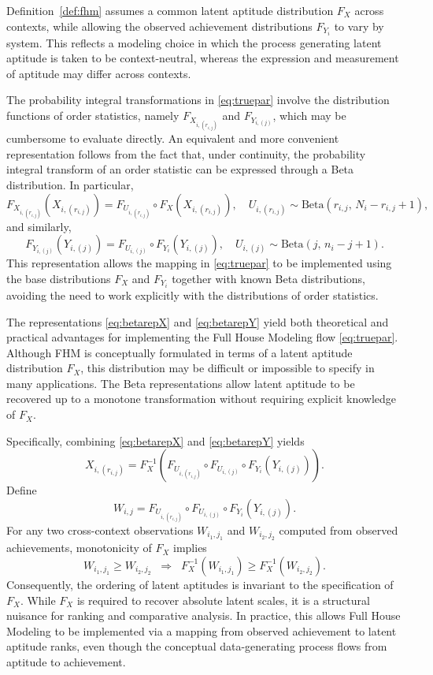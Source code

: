 \documentclass[12pt]{article}
\begin{document}
Definition~\ref{def:fhm} assumes a common latent aptitude distribution $F_X$ across contexts, while allowing the observed achievement distributions $F_{Y_i}$ to vary by system. This reflects a modeling choice in which the process generating latent aptitude is taken to be context-neutral, whereas the expression and measurement of aptitude may differ across contexts.

The probability integral transformations in \eqref{eq:truepar} involve the distribution functions of order statistics, namely $F_{X_{i,(r_{i,j})}}$ and $F_{Y_{i,(j)}}$, which may be cumbersome to evaluate directly. An equivalent and more convenient representation follows from the fact that, under continuity, the probability integral transform of an order statistic can be expressed through a Beta distribution. In particular,
\begin{equation} \label{eq:betarepX}
F_{X_{i,(r_{i,j})}}\!\left(X_{i,(r_{i,j})}\right)
= F_{U_{i,(r_{i,j})}} \circ F_X\!\left(X_{i,(r_{i,j})}\right),
\quad U_{i,(r_{i,j})} \sim \mathrm{Beta}\!\left(r_{i,j},\, N_i - r_{i,j} + 1\right),	
\end{equation}
and similarly,
\begin{equation} \label{eq:betarepY}
F_{Y_{i,(j)}}\!\left(Y_{i,(j)}\right)
= F_{U_{i,(j)}} \circ F_{Y_i}\!\left(Y_{i,(j)}\right),
\quad U_{i,(j)} \sim \mathrm{Beta}\!\left(j,\, n_i - j + 1\right).
\end{equation}
This representation allows the mapping in \eqref{eq:truepar} to be implemented using the base distributions $F_X$ and $F_{Y_i}$ together with known Beta distributions, avoiding the need to work explicitly with the distributions of order statistics. 

The representations \eqref{eq:betarepX} and \eqref{eq:betarepY} yield both theoretical and practical advantages for implementing the Full House Modeling flow \eqref{eq:truepar}. Although FHM is conceptually formulated in terms of a latent aptitude distribution $F_X$, this distribution may be difficult or impossible to specify in many applications. The Beta representations allow latent aptitude to be recovered up to a monotone transformation without requiring explicit knowledge of $F_X$.

Specifically, combining \eqref{eq:betarepX} and \eqref{eq:betarepY} yields
$$
X_{i,(r_{i,j})} = F_X^{-1}\!\left(
F_{U_{i,(r_{i,j})}} \circ F_{U_{i,(j)}} \circ F_{Y_i}\!\left(Y_{i,(j)}\right)
\right).
$$
Define
$$
W_{i,j} = F_{U_{i,(r_{i,j})}} \circ F_{U_{i,(j)}} \circ F_{Y_i}\!\left(Y_{i,(j)}\right).
$$
For any two cross-context observations $W_{i_1,j_1}$ and $W_{i_2,j_2}$ computed from observed achievements, monotonicity of $F_X$ implies
$$
  W_{i_1,j_1} \ge W_{i_2,j_2} \;\;\Longrightarrow\;\; 
    F_X^{-1}(W_{i_1,j_1}) \ge F_X^{-1}(W_{i_2,j_2}).
$$
Consequently, the ordering of latent aptitudes is invariant to the specification of $F_X$. While $F_X$ is required to recover absolute latent scales, it is a structural nuisance for ranking and comparative analysis. In practice, this allows Full House Modeling to be implemented via a mapping from observed achievement to latent aptitude ranks, even though the conceptual data-generating process flows from aptitude to achievement.
\end{document}
